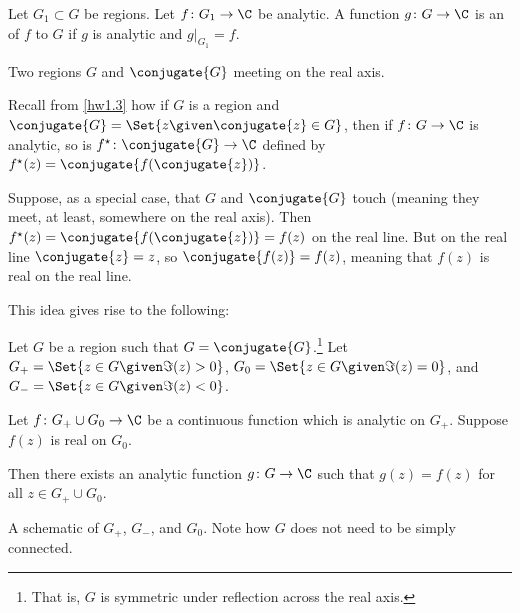 


\begin{definition}
	Let $G_1 \subset G$ be regions.
	Let $f \colon G_1 \to \C$ be analytic.
	A function $g \colon G \to \C$ is an  of $f$ to $G$ if $g$ is analytic and $g \big\rvert_{G_1} = f$.
\end{definition}

\begin{marginfigure}

	\caption{\label{l29:figa} Two regions $G$ and $\conjugate{G}$ meeting on the real axis.}
\end{marginfigure}

Recall from \autoref{hw1.3} how if $G$ is a region and $\conjugate{G} = \Set{z \given \conjugate{z} \in G}$, then if $f \colon G \to \C$ is analytic, so is $f^\star \colon \conjugate{G} \to \C$ defined by $f^\star(z) = \conjugate{f(\conjugate{z})}$.

Suppose, as a special case, that $G$ and $\conjugate{G}$ touch (meaning they meet, at least, somewhere on the real axis).
Then $f^\star(z) = \conjugate{f(\conjugate{z})} = f(z)$ on the real line.
But on the real line $\conjugate{z} = z$, so $\conjugate{f(z)} = f(z)$, meaning that $f(z)$ is real on the real line.

This idea gives rise to the following:

\begin{theorem}\label{thm11.1}
	Let $G$ be a region such that $G = \conjugate{G}$.\footnote{That is, $G$ is symmetric under reflection across the real axis.}
	Let $G_+ = \Set{z \in G \given \Im(z)> 0}$, $G_0 = \Set{z \in G \given \Im(z) = 0}$, and $G_- = \Set{z \in G \given \Im(z) < 0}$.

	Let $f \colon G_+ \cup G_0 \to \C$ be a continuous function which is analytic on $G_+$.
	Suppose $f(z)$ is real on $G_0$.

	Then there exists an analytic function $g \colon G \to \C$ such that $g(z) = f(z)$ for all $z \in G_+ \cup G_0$.
\end{theorem}

\begin{marginfigure}

	\caption{\label{l29:fig11.1a} A schematic of $G_+$, $G_-$, and $G_0$.
	Note how $G$ does not need to be simply connected.}
\end{marginfigure}

